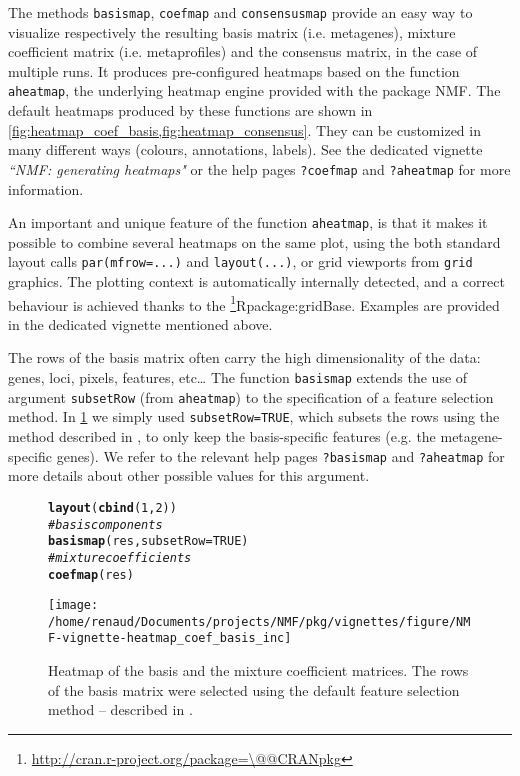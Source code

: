 \documentclass[a4paper]{article}\usepackage[]{graphicx}\usepackage[]{color}
\makeatletter
\def\maxwidth{ %
  \ifdim\Gin@nat@width>\linewidth
    \linewidth
  \else
    \Gin@nat@width
  \fi
}
\newcommand{\hlnum}[1]{\textcolor[rgb]{0.686,0.059,0.569}{#1}}%
\newcommand{\hlcom}[1]{\textcolor[rgb]{0.678,0.584,0.686}{\textit{#1}}}%
\newcommand{\hlstd}[1]{\textcolor[rgb]{0.345,0.345,0.345}{#1}}%
\newcommand{\hlkwc}[1]{\textcolor[rgb]{0.333,0.667,0.333}{#1}}%
\newcommand{\hlkwd}[1]{\textcolor[rgb]{0.737,0.353,0.396}{\textbf{#1}}}%
\newenvironment{kframe}{%
 \def\at@end@of@kframe{}%
 \ifinner\ifhmode%
  \def\at@end@of@kframe{\end{minipage}}%
  \begin{minipage}{\columnwidth}%
 \fi\fi%
 \def\FrameCommand##1{\hskip\@totalleftmargin \hskip-\fboxsep
 \colorbox{shadecolor}{##1}\hskip-\fboxsep
     \hskip-\linewidth \hskip-\@totalleftmargin \hskip\columnwidth}%
 \MakeFramed {\advance\hsize-\width
   \@totalleftmargin\z@ \linewidth\hsize
   \@setminipage}}%
 {\par\unskip\endMakeFramed%
 \at@end@of@kframe}
\newenvironment{knitrout}{}{} %
\let\code=\texttt
\newcommand{\pkgname}[1]{\textit{#1}\xspace}
\newcommand{\CRANurl}[1]{\url{http://cran.r-project.org/package=#1}}
\def\CRANpkg{\@ifstar\@CRANpkg\@@CRANpkg}
\def\@CRANpkg#1{\href{http://cran.r-project.org/package=#1}{\pkgname{#1}}\footnote{\CRANurl{#1}}}
\def\@@CRANpkg#1{\href{http://cran.r-project.org/package=#1}{\pkgname{#1}} package\footnote{\CRANurl{#1}}}
\def\citeCRANpkg{\@ifstar\@citeCRANpkg\@@citeCRANpkg}
\def\@citeCRANpkg#1{\CRANpkg{#1}\cite*{Rpackage:#1}}
\def\@@citeCRANpkg#1{\CRANpkg{#1}~\cite{Rpackage:#1}}
\renewcommand{\cite}[1]{\parencite{#1}}
\makeatother
\begin{document}
The methods \code{basismap}, \code{coefmap} and \code{consensusmap} provide an
easy way to visualize respectively the resulting basis matrix (i.e. metagenes),
mixture coefficient matrix (i.e. metaprofiles) and the consensus matrix, in the
case of multiple runs.
It produces pre-configured heatmaps based on the function \code{aheatmap}, the
underlying heatmap engine provided with the package NMF. 
The default heatmaps produced by these functions are shown in
\cref{fig:heatmap_coef_basis,fig:heatmap_consensus}.
They can be customized in many different ways (colours, annotations, labels).
See the dedicated vignette \emph{``NMF: generating heatmaps"} or the help pages
\code{?coefmap} and \code{?aheatmap} for more information.

An important and unique feature of the function \code{aheatmap}, is that it
makes it possible to combine several heatmaps on the same plot, using the both
standard layout calls \texttt{par(mfrow=...)} and \texttt{layout(...)}, or grid
viewports from \texttt{grid} graphics.
The plotting context is automatically internally detected, and a correct
behaviour is achieved thanks to the \citeCRANpkg{gridBase}.
Examples are provided in the dedicated vignette mentioned above.

The rows of the basis matrix often carry the high dimensionality of the data: genes, loci, pixels, features, etc\ldots 
The function \code{basismap} extends the use of argument \code{subsetRow} (from \code{aheatmap}) to the specification of a feature selection method.
In \cref{fig:heatmap_coef_basis} we simply used \code{subsetRow=TRUE}, which subsets the rows using the method described in \cite{KimH2007}, to only keep the basis-specific features (e.g. the metagene-specific genes). 
We refer to the relevant help pages \code{?basismap} and \code{?aheatmap} for more details about other possible values for this argument.

\begin{figure}[!htbp]
\centering
\begin{knitrout}
\color{fgcolor}\begin{kframe}
\begin{alltt}
\hlkwd{layout}\hlstd{(}\hlkwd{cbind}\hlstd{(}\hlnum{1}\hlstd{,}\hlnum{2}\hlstd{))}
\hlcom{# basis components}
\hlkwd{basismap}\hlstd{(res,} \hlkwc{subsetRow}\hlstd{=}\hlnum{TRUE}\hlstd{)}
\hlcom{# mixture coefficients}
\hlkwd{coefmap}\hlstd{(res)}
\end{alltt}
\end{kframe}
\texttt{[image: /home/renaud/Documents/projects/NMF/pkg/vignettes/figure/NMF-vignette-heatmap\_coef\_basis\_inc]} 

\end{knitrout}
\caption{Heatmap of the basis and the mixture coefficient matrices. The rows of the basis matrix were selected using the default feature selection method -- described in \cite{KimH2007}.}
\label{fig:heatmap_coef_basis}
\end{figure}
\end{document}
